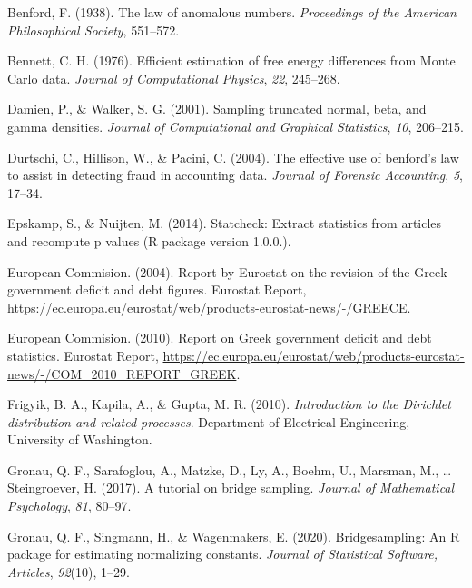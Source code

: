 \documentclass[
  english,
  man,floatsintext]{apa6}
\newlength{\cslhangindent}
\newenvironment{cslreferences}%
  {\setlength{\parindent}{0pt}%
  \everypar{\setlength{\hangindent}{\cslhangindent}}\ignorespaces}%
  {\par}
\begin{document}
\hypertarget{refs}{}
\begin{cslreferences}
\leavevmode\hypertarget{ref-benford1938law}{}%
Benford, F. (1938). The law of anomalous numbers. \emph{Proceedings of the American Philosophical Society}, 551--572.

\leavevmode\hypertarget{ref-bennett1976efficient}{}%
Bennett, C. H. (1976). Efficient estimation of free energy differences from Monte Carlo data. \emph{Journal of Computational Physics}, \emph{22}, 245--268.

\leavevmode\hypertarget{ref-damien2001sampling}{}%
Damien, P., \& Walker, S. G. (2001). Sampling truncated normal, beta, and gamma densities. \emph{Journal of Computational and Graphical Statistics}, \emph{10}, 206--215.

\leavevmode\hypertarget{ref-durtschi2004effective}{}%
Durtschi, C., Hillison, W., \& Pacini, C. (2004). The effective use of benford's law to assist in detecting fraud in accounting data. \emph{Journal of Forensic Accounting}, \emph{5}, 17--34.

\leavevmode\hypertarget{ref-epskamp2014statcheck}{}%
Epskamp, S., \& Nuijten, M. (2014). Statcheck: Extract statistics from articles and recompute p values (R package version 1.0.0.).

\leavevmode\hypertarget{ref-europeanCommision2004}{}%
European Commision. (2004). Report by Eurostat on the revision of the Greek government deficit and debt figures. Eurostat Report, \url{https://ec.europa.eu/eurostat/web/products-eurostat-news/-/GREECE}.

\leavevmode\hypertarget{ref-europeanCommision2010}{}%
European Commision. (2010). Report on Greek government deficit and debt statistics. Eurostat Report, \url{https://ec.europa.eu/eurostat/web/products-eurostat-news/-/COM_2010_REPORT_GREEK}.

\leavevmode\hypertarget{ref-frigyik2010introduction}{}%
Frigyik, B. A., Kapila, A., \& Gupta, M. R. (2010). \emph{Introduction to the Dirichlet distribution and related processes}. Department of Electrical Engineering, University of Washington.

\leavevmode\hypertarget{ref-gronau2017tutorial}{}%
Gronau, Q. F., Sarafoglou, A., Matzke, D., Ly, A., Boehm, U., Marsman, M., \ldots{} Steingroever, H. (2017). A tutorial on bridge sampling. \emph{Journal of Mathematical Psychology}, \emph{81}, 80--97.

\leavevmode\hypertarget{ref-gronau2017bridgesampling}{}%
Gronau, Q. F., Singmann, H., \& Wagenmakers, E. (2020). Bridgesampling: An R package for estimating normalizing constants. \emph{Journal of Statistical Software, Articles}, \emph{92}(10), 1--29.


\end{cslreferences}
\end{document}
